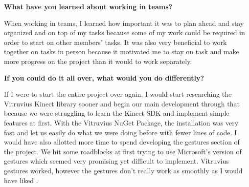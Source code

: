\documentclass[onecolumn, draftclsnofoot,10pt, compsoc]{IEEEtran}
\begin{document}
\begin{flushleft}
\textbf{What have you learned about working in teams?}\par
When working in teams, I learned how important it was to plan ahead and stay organized and on top of my tasks because some of my work could be required in order to start on other members' tasks. It was also very beneficial to work together on tasks in person because it motivated me to stay on task and make more progress on the project than it would to work separately. 

\textbf{If you could do it all over, what would you do differently?}\par
If I were to start the entire project over again, I would start researching the Vitruvius Kinect library sooner and begin our main development through that because we were struggling to learn the Kinect SDK and implement simple features at first. With the Vitruvius NuGet Package, the installation was very fast and let us easily do what we were doing before with fewer lines of code. I would have also allotted more time to spend developing the gestures section of the project. We hit some roadblocks at first trying to use Microsoft's version of gestures which seemed very promising yet difficult to implement. Vitruvius gestures worked, however the gestures don't really work as smoothly as I would have liked \cite{Vitruvius}.

\end{flushleft}
\end{document}
